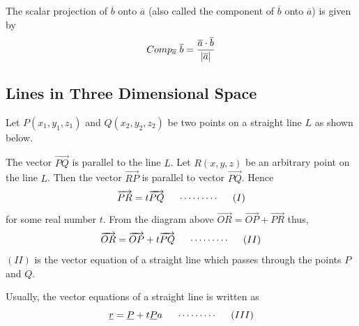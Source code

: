 \documentclass[11pt,a4paper]{article}
\theoremstyle{definition}
\begin{document}
The scalar projection of $\overline{b}$ onto $\overline{a}$ (also called the component of $\overline{b}$ onto $\overline{a}$) is given by $$Comp_{\overline{a}}\hspace{0.1cm}\overline{b} = \frac{\overline{a} \cdot \overline{b}}{\left|\overline{a}\right|
}$$


\subsection{Lines in Three Dimensional Space}
Let $P(x_1,y_1,z_1)$ and $Q(x_2,y_2,z_2)$ be two points on a straight line $L$ as shown below.


\begin{figure}[H]
\centering
{}
\end{figure}

The vector $\overrightarrow{PQ}$ is parallel to the line $L$. Let $R(x,y,z)$ be an arbitrary point on the line $L$. Then the vector $\overrightarrow{RP}$ is parallel to vector $\overrightarrow{PQ}$. Hence $$ \overrightarrow{PR} = t \overrightarrow{PQ}\hspace{0.5cm} \cdots\cdots\cdots\hspace{0.5cm} (I)$$
for some real number $t$. From the diagram above $\overrightarrow{OR} = \overrightarrow{OP} + \overrightarrow{PR}$ thus, $$\overrightarrow{OR} = \overrightarrow{OP} + t \overrightarrow{PQ}\hspace{0.5cm} \cdots\cdots\cdots\hspace{0.5cm} (II)$$
$(II)$ is the vector equation of a straight line which passes through the points $P$ and $Q$.


Usually, the vector equations of a straight line is written as
$$\underline{r} = \underline{P} + t \underline{P}a\hspace{0.5cm} \cdots\cdots\cdots \hspace{0.5cm} (III)$$
\end{document}
